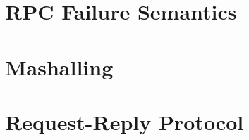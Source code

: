 \documentclass{tudexercise}
\begin{document}
	\section{RPC Failure Semantics}
		
		
	\section{Mashalling}
		
		
	\section{Request-Reply Protocol}
		
		
\end{document}
